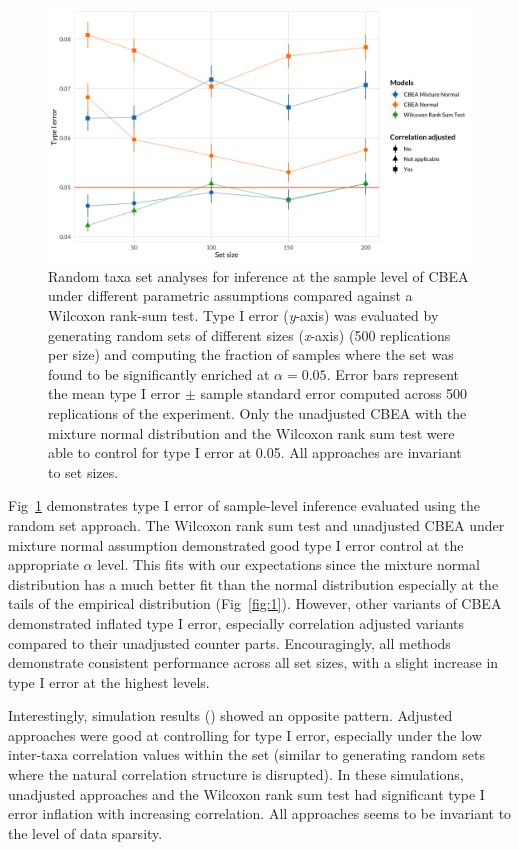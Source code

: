 \documentclass[10pt,letterpaper]{article}
\begin{document}
\begin{figure}[!h]
    \centering
    \includegraphics[width = \textwidth]{figures/data_ss_fdr_new.png}
    \caption{Random taxa set analyses for inference at the sample level of CBEA under different parametric assumptions compared against a Wilcoxon rank-sum test. Type I error (\emph{y}-axis) was evaluated by generating random sets of different sizes (\emph{x}-axis) (500 replications per size) and computing the fraction of samples where the set was found to be significantly enriched at $\alpha = 0.05$. Error bars represent the mean type I error $\pm$ sample standard error computed across 500 replications of the experiment. Only the unadjusted CBEA with the mixture normal distribution and the Wilcoxon rank sum test were able to control for type I error at 0.05. All approaches are invariant to set sizes.} 
    \label{fig:2}
\end{figure}

Fig~\ref{fig:2} demonstrates type I error of sample-level inference evaluated using the random set approach. The Wilcoxon rank sum test and unadjusted CBEA under mixture normal assumption demonstrated good type I error control at the appropriate $\alpha$ level. This fits with our expectations since the mixture normal distribution has a much better fit than the normal distribution especially at the tails of the empirical distribution (Fig~\ref{fig:1}). However, other variants of CBEA demonstrated inflated type I error, especially correlation adjusted variants compared to their unadjusted counter parts. Encouragingly, all methods demonstrate consistent performance across all set sizes, with a slight increase in type I error at the highest levels.   

Interestingly, simulation results () showed an opposite pattern. Adjusted approaches were good at controlling for type I error, especially under the low inter-taxa correlation values within the set (similar to generating random sets where the natural correlation structure is disrupted). In these simulations, unadjusted approaches and the Wilcoxon rank sum test had significant type I error inflation with increasing correlation. All approaches seems to be invariant to the level of data sparsity.  
\end{document}
